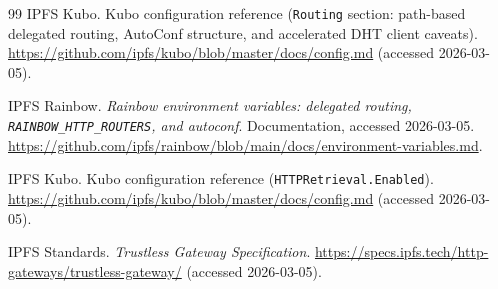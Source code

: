 \documentclass[11pt]{article}
\begin{document}
\begin{thebibliography}{99}
IPFS Kubo.
\newblock Kubo configuration reference (\texttt{Routing} section: path-based delegated routing, AutoConf structure, and accelerated DHT client caveats).
\newblock \url{https://github.com/ipfs/kubo/blob/master/docs/config.md} (accessed 2026-03-05).



IPFS Rainbow.
\newblock \emph{Rainbow environment variables: delegated routing, \texttt{RAINBOW\_HTTP\_ROUTERS}, and autoconf}.
\newblock Documentation, accessed 2026-03-05.
\newblock \url{https://github.com/ipfs/rainbow/blob/main/docs/environment-variables.md}.

IPFS Kubo.
\newblock Kubo configuration reference (\texttt{HTTPRetrieval.Enabled}).
\newblock \url{https://github.com/ipfs/kubo/blob/master/docs/config.md} (accessed 2026-03-05).

IPFS Standards.
\newblock \emph{Trustless Gateway Specification}.
\newblock \url{https://specs.ipfs.tech/http-gateways/trustless-gateway/} (accessed 2026-03-05).

\end{thebibliography}
\end{document}

